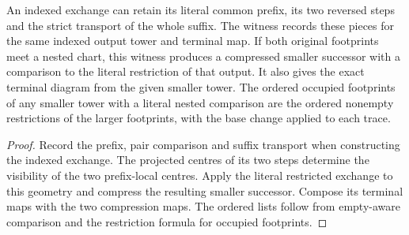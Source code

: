 \begin{proposition}
\label{hir:g8-indexed-nested-exchange-geometry}
\leanok
An indexed exchange can retain its literal common prefix, its two
reversed steps and the strict transport of the whole suffix. The
witness records these pieces for the same indexed output tower and
terminal map. If both original footprints meet a nested chart, this
witness produces a compressed smaller successor with a comparison
to the literal restriction of that output. It also gives the exact
terminal diagram from the given smaller tower. The ordered occupied
footprints of any smaller tower with a literal nested comparison are
the ordered nonempty restrictions of the larger footprints, with the
base change applied to each trace.
\end{proposition}
\begin{proof}
Record the prefix, pair comparison and suffix transport when
constructing the indexed exchange. The projected centres of its
two steps determine the visibility of the two prefix-local
centres. Apply the literal restricted exchange to this geometry
and compress the resulting smaller successor. Compose its
terminal maps with the two compression maps. The ordered lists
follow from empty-aware comparison and the restriction formula
for occupied footprints.
\end{proof}

